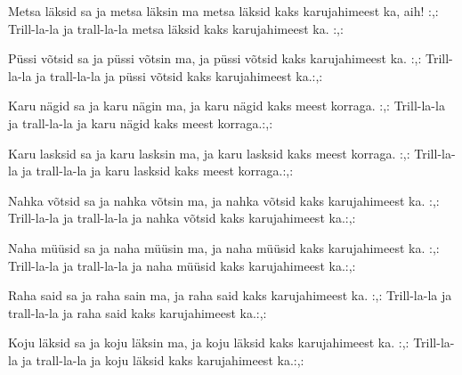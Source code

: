 Metsa l\"aksid sa ja metsa l\"aksin ma
metsa l\"aksid kaks karujahimeest ka, aih!
:,: Trill-la-la ja trall-la-la
metsa l\"aksid kaks karujahimeest ka. :,: 

P\"ussi v\~otsid sa ja p\"ussi v\~otsin ma,
ja p\"ussi v\~otsid kaks karujahimeest ka.
:,: Trill-la-la ja trall-la-la
ja p\"ussi v\~otsid kaks karujahimeest ka.:,: 

Karu n\"agid sa ja karu n\"agin ma,
ja karu n\"agid kaks meest korraga.
:,: Trill-la-la ja trall-la-la
ja karu n\"agid kaks meest korraga.:,: 

Karu lasksid sa ja karu lasksin ma,
ja karu lasksid kaks meest korraga.
:,: Trill-la-la ja trall-la-la
ja karu lasksid kaks meest korraga.:,: 

Nahka v\~otsid sa ja nahka v\~otsin ma,
ja nahka v\~otsid kaks karujahimeest ka.
:,: Trill-la-la ja trall-la-la
ja nahka v\~otsid kaks karujahimeest ka.:,: 

Naha m\"u\"usid sa ja naha m\"u\"usin ma,
ja naha m\"u\"usid kaks karujahimeest ka.
:,: Trill-la-la ja trall-la-la
ja naha m\"u\"usid kaks karujahimeest ka.:,: 

Raha said sa ja raha sain ma,
ja raha said kaks karujahimeest ka.
:,: Trill-la-la ja trall-la-la
ja raha said kaks karujahimeest ka.:,: 

Koju l\"aksid sa ja koju l\"aksin ma,
ja koju l\"aksid kaks karujahimeest ka.
:,: Trill-la-la ja trall-la-la
ja koju l\"aksid kaks karujahimeest ka.:,: 